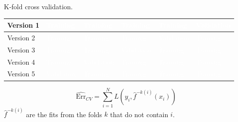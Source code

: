 \documentclass[xcolor={table}, handout]{beamer}
\begin{document}
\begin{frame}{K-fold cross validation.}

\begin{table}[]
\renewcommand{\arraystretch}{2.5}
\begin{tabular}{l >{\centering\arraybackslash}m{2cm} |>{\centering\arraybackslash}p{2cm}|>{\centering\arraybackslash}p{2cm}|>{\centering\arraybackslash}p{2cm}|>{\centering\arraybackslash}p{2cm} }
Version 1 & \cellcolor{Contrast1l} \textcolor{white}{Training} & \cellcolor{Contrast1l} \textcolor{white}{Training} & \cellcolor{Contrast1l} \textcolor{white}{Training} & \cellcolor{Contrast1l} \textcolor{white}{Training} & \cellcolor{Contrast4l} \textcolor{white}{Validation} \\
\hline
Version 2 & \cellcolor{Contrast1l} \textcolor{white}{Training}& \cellcolor{Contrast1l} \textcolor{white}{Training}& \cellcolor{Contrast1l} \textcolor{white}{Training} & \cellcolor{Contrast4l} \textcolor{white}{Validation} & \cellcolor{Contrast1l} \textcolor{white}{Training} \\
\hline
Version 3 &  \cellcolor{Contrast1l} \textcolor{white}{Training} & \cellcolor{Contrast1l} \textcolor{white}{Training}&\cellcolor{Contrast4l} \textcolor{white}{Validation}& \cellcolor{Contrast1l} \textcolor{white}{Training} & \cellcolor{Contrast1l} \textcolor{white}{Training} \\
\hline
Version 4 & \cellcolor{Contrast1l} \textcolor{white}{Training}& \cellcolor{Contrast4l} \textcolor{white}{Validation}& \cellcolor{Contrast1l} \textcolor{white}{Training}& \cellcolor{Contrast1l} \textcolor{white}{Training}  & \cellcolor{Contrast1l} \textcolor{white}{Training} \\
\hline
Version 5 & \cellcolor{Contrast4l} \textcolor{white}{Validation}& \cellcolor{Contrast1l} \textcolor{white}{Training}& \cellcolor{Contrast1l} \textcolor{white}{Training}& \cellcolor{Contrast1l} \textcolor{white}{Training}  & \cellcolor{Contrast1l} \textcolor{white}{Training} \\
\hline
\end{tabular}
\end{table}

\[
\widehat{\textrm{Err}}_{CV} = \sum_{i = 1}^N L\left(y_i, \hat{f}^{-k(i)}(x_i) \right)
\]
$\hat{f}^{-k(i)}$ are the fits from the folds $k$ that do not contain $i$. 


\end{frame}


\end{document}
